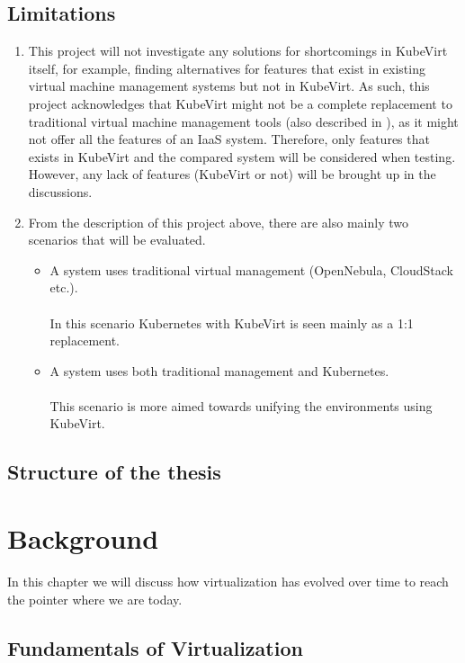 \documentclass{kththesis}
\begin{document}
\section{Limitations}
\begin{enumerate}
    \item This project will not investigate any solutions for shortcomings in KubeVirt itself, for example, finding alternatives for features that exist in existing virtual machine management systems but not in KubeVirt. As such, this project acknowledges that KubeVirt might not be a complete replacement to traditional virtual machine management tools (also described in \cite{kupenstack}), as it might not offer all the features of an IaaS system. Therefore, only features that exists in KubeVirt and the compared system will be considered when testing. However, any lack of features (KubeVirt or not) will be brought up in the discussions.  
    \item From the description of this project above, there are also mainly two scenarios that will be evaluated. 
    \begin{itemize}
        \item A system uses traditional virtual management (OpenNebula, CloudStack etc.). \\
        \\
        In this scenario Kubernetes with KubeVirt is seen mainly as a 1:1 replacement.\\ 
        \item A system uses both traditional management and Kubernetes. \\
        \\
        This scenario is more aimed towards unifying the environments using KubeVirt. \\
    \end{itemize}
\end{enumerate}

\section{Structure of the thesis}

\chapter{Background}

In this chapter we will discuss how virtualization has evolved over time to reach the pointer where we are today.


\section{Fundamentals of Virtualization}
\end{document}

